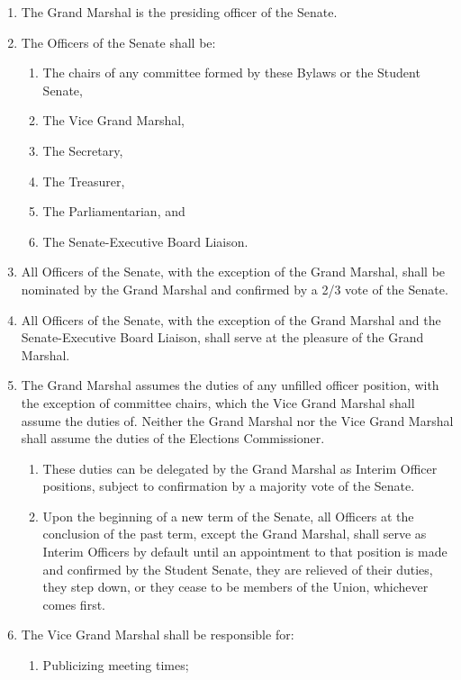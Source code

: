 
\begin{enumerate}
\item The Grand Marshal is the presiding officer of the Senate.
\item The Officers of the Senate shall be:
  \begin{enumerate}
  \item The chairs of any committee formed by these Bylaws or the Student Senate,
  \item The Vice Grand Marshal,
  \item The Secretary,
  \item The Treasurer,
  \item The Parliamentarian, and
  \item The Senate-Executive Board Liaison.
  \end{enumerate}
\item All Officers of the Senate, with the exception of the Grand Marshal, shall be nominated by the Grand Marshal and confirmed by a 2/3 vote of the Senate.
\item All Officers of the Senate, with the exception of the Grand Marshal and the Senate-Executive Board Liaison, shall serve at the pleasure of the Grand Marshal.
\item The Grand Marshal assumes the duties of any unfilled officer position, with the exception of committee chairs, which the Vice Grand Marshal shall assume the duties of. Neither the Grand Marshal nor the Vice Grand Marshal shall assume the duties of the Elections Commissioner.
  \begin{enumerate}
  \item These duties can be delegated by the Grand Marshal as Interim Officer positions, subject to confirmation by a majority vote of the Senate.
  \item Upon the beginning of a new term of the Senate, all Officers at the conclusion of the past term, except the Grand Marshal, shall serve as Interim Officers by default until an appointment to that position is made and confirmed by the Student Senate, they are relieved of their duties, they step down, or they cease to be members of the Union, whichever comes first.
  \end{enumerate}
\item The Vice Grand Marshal shall be responsible for:
  \begin{enumerate}
  \item Publicizing meeting times;

\end{enumerate}
\end{enumerate}
